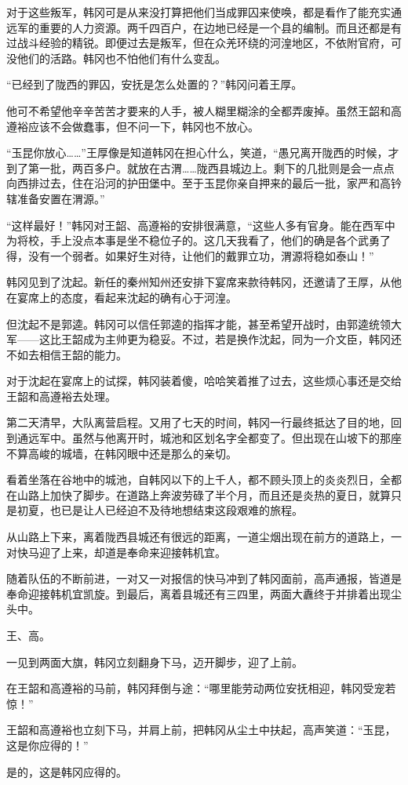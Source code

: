 对于这些叛军，韩冈可是从来没打算把他们当成罪囚来使唤，都是看作了能充实通远军的重要的人力资源。两千四百户，在边地已经是一个县的编制。而且还都是有过战斗经验的精锐。即便过去是叛军，但在众羌环绕的河湟地区，不依附官府，可没他们的活路。韩冈也不怕他们有什么变乱。

“已经到了陇西的罪囚，安抚是怎么处置的？”韩冈问着王厚。

他可不希望他辛辛苦苦才要来的人手，被人糊里糊涂的全都弄废掉。虽然王韶和高遵裕应该不会做蠢事，但不问一下，韩冈也不放心。

“玉昆你放心……”王厚像是知道韩冈在担心什么，笑道，“愚兄离开陇西的时候，才到了第一批，两百多户。就放在古渭……陇西县城边上。剩下的几批则是会一点点向西排过去，住在沿河的护田堡中。至于玉昆你亲自押来的最后一批，家严和高钤辖准备安置在渭源。”

“这样最好！”韩冈对王韶、高遵裕的安排很满意，“这些人多有官身。能在西军中为将校，手上没点本事是坐不稳位子的。这几天我看了，他们的确是各个武勇了得，没有一个弱者。如果好生对待，让他们的戴罪立功，渭源将稳如泰山！”

韩冈见到了沈起。新任的秦州知州还安排下宴席来款待韩冈，还邀请了王厚，从他在宴席上的态度，看起来沈起的确有心于河湟。

但沈起不是郭逵。韩冈可以信任郭逵的指挥才能，甚至希望开战时，由郭逵统领大军——这比王韶成为主帅更为稳妥。不过，若是换作沈起，同为一介文臣，韩冈还不如去相信王韶的能力。

对于沈起在宴席上的试探，韩冈装着傻，哈哈笑着推了过去，这些烦心事还是交给王韶和高遵裕去处理。

第二天清早，大队离营启程。又用了七天的时间，韩冈一行最终抵达了目的地，回到通远军中。虽然与他离开时，城池和区划名字全都变了。但出现在山坡下的那座不算高峻的城墙，在韩冈眼中还是那么的亲切。

看着坐落在谷地中的城池，自韩冈以下的上千人，都不顾头顶上的炎炎烈日，全都在山路上加快了脚步。在道路上奔波劳碌了半个月，而且还是炎热的夏日，就算只是初夏，也已是让人已经迫不及待地想结束这段艰难的旅程。

从山路上下来，离着陇西县城还有很远的距离，一道尘烟出现在前方的道路上，一对快马迎了上来，却道是奉命来迎接韩机宜。

随着队伍的不断前进，一对又一对报信的快马冲到了韩冈面前，高声通报，皆道是奉命迎接韩机宜凯旋。到最后，离着县城还有三四里，两面大纛终于并排着出现尘头中。

王、高。

一见到两面大旗，韩冈立刻翻身下马，迈开脚步，迎了上前。

在王韶和高遵裕的马前，韩冈拜倒与途：“哪里能劳动两位安抚相迎，韩冈受宠若惊！”

王韶和高遵裕也立刻下马，并肩上前，把韩冈从尘土中扶起，高声笑道：“玉昆，这是你应得的！”

是的，这是韩冈应得的。

